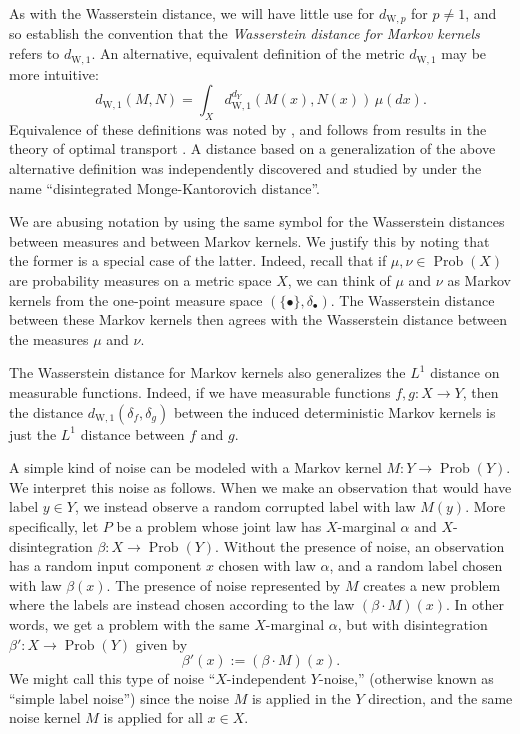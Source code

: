\documentclass[twoside,11pt]{article}
\DeclareMathOperator{\prob}{Prob}
\newcommand{\dWp}[1]{d_{\mathrm{W},#1}}
\newcommand{\dW}{\dWp 1}
\newcommand{\dWkernp}[1]{d_{\mathrm{W},#1}}
\newcommand{\dWkern}{\dWkernp{1}}
\begin{document}
    As with the Wasserstein distance, we will have little use for $\dWkernp{p}$ for $p\neq 1$, and so establish the convention that the \emph{Wasserstein distance for Markov kernels} refers to $\dWkern$.
    An alternative, equivalent definition of the metric $\dWkern$ may be more intuitive:
    \[\dWkern(M,N) = \int_X \dW^{d_Y}(M(x),N(x)) \, \mu(dx).\]
    Equivalence of these definitions was noted by \citet{patterson2020}, and follows from results in the theory of optimal transport \citep[Corollary 5.22]{Villani_old_and_new_2008}. A distance based on a generalization of the above alternative definition was independently discovered and studied by \citet{kitagawa_two_2023} under the name ``disintegrated Monge-Kantorovich distance''.

    We are abusing notation by using the same symbol for the Wasserstein distances between measures and between Markov kernels. We justify this by noting that the former is a special case of the latter. Indeed, recall that if $\mu,\nu \in \prob(X)$ are probability measures on a metric space $X$, we can think of $\mu$ and $\nu$ as Markov kernels from the one-point measure space $(\{\bullet\}, \delta_\bullet)$. The Wasserstein distance between these Markov kernels then agrees with the Wasserstein distance between the measures $\mu$ and $\nu$.

    The Wasserstein distance for Markov kernels also generalizes the $L^1$ distance on measurable functions. Indeed, if we have measurable functions $f,g:X\to Y$, then the distance $\dW(\delta_f,\delta_g)$ between the induced deterministic Markov kernels is just the $L^1$ distance between $f$ and $g$.
    
    A simple kind of noise can be modeled with a Markov kernel $M: Y\to \prob(Y)$. We interpret this noise as follows. When we make an observation that would have label $y\in Y$, we instead observe a random corrupted label with law $M(y)$. More specifically, let $P$ be a problem whose joint law has $X$-marginal $\alpha$ and $X$-disintegration $\beta:X\to \prob(Y)$. Without the presence of noise, an observation has a random input component $x$ chosen with law $\alpha$, and a random label chosen with law $\beta(x)$. The presence of noise represented by $M$ creates a new problem where the labels are instead chosen according to the law $(\beta \cdot M)(x)$. In other words, we get a problem with the same $X$-marginal $\alpha$, but with disintegration $\beta':X\to \prob(Y)$ given by
    \[\beta'(x) := (\beta\cdot M)(x).\]
    We might call this type of noise ``$X$-independent $Y$-noise,'' (otherwise known as ``simple label noise'') since the noise $M$ is applied in the $Y$ direction, and the same noise kernel $M$ is applied for all $x\in X$.
    
\end{document}
